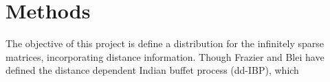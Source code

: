 \chapter{Methods}%

The objective of this project is define a distribution for the infinitely
sparse matrices, incorporating distance information. Though Frazier and Blei
have defined the distance dependent Indian buffet process (dd-IBP), which

